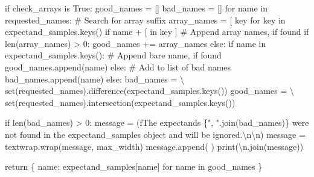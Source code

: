 \documentclass[
  letterpaper,
  DIV=11,
  numbers=noendperiod]{scrartcl}
\newenvironment{Shaded}{\begin{snugshade}}{\end{snugshade}}
\newcommand{\BuiltInTok}[1]{\textcolor[rgb]{0.00,0.23,0.31}{#1}}
\newcommand{\CharTok}[1]{\textcolor[rgb]{0.13,0.47,0.30}{#1}}
\newcommand{\CommentTok}[1]{\textcolor[rgb]{0.37,0.37,0.37}{#1}}
\newcommand{\ControlFlowTok}[1]{\textcolor[rgb]{0.00,0.23,0.31}{#1}}
\newcommand{\DecValTok}[1]{\textcolor[rgb]{0.68,0.00,0.00}{#1}}
\newcommand{\KeywordTok}[1]{\textcolor[rgb]{0.00,0.23,0.31}{#1}}
\newcommand{\NormalTok}[1]{\textcolor[rgb]{0.00,0.23,0.31}{#1}}
\newcommand{\OperatorTok}[1]{\textcolor[rgb]{0.37,0.37,0.37}{#1}}
\newcommand{\SpecialCharTok}[1]{\textcolor[rgb]{0.37,0.37,0.37}{#1}}
\newcommand{\SpecialStringTok}[1]{\textcolor[rgb]{0.13,0.47,0.30}{#1}}
\newcommand{\StringTok}[1]{\textcolor[rgb]{0.13,0.47,0.30}{#1}}
\newcommand{\VariableTok}[1]{\textcolor[rgb]{0.07,0.07,0.07}{#1}}
\begin{document}
\begin{Shaded}
\begin{Highlighting}[]
  \ControlFlowTok{if}\NormalTok{ check\_arrays }\KeywordTok{is} \VariableTok{True}\NormalTok{:}
\NormalTok{    good\_names }\OperatorTok{=}\NormalTok{ []}
\NormalTok{    bad\_names }\OperatorTok{=}\NormalTok{ []}
    \ControlFlowTok{for}\NormalTok{ name }\KeywordTok{in}\NormalTok{ requested\_names:}
      \CommentTok{\# Search for array suffix}
\NormalTok{      array\_names }\OperatorTok{=}\NormalTok{ [ key }\ControlFlowTok{for}\NormalTok{ key }\KeywordTok{in}\NormalTok{ expectand\_samples.keys()}
                      \ControlFlowTok{if}\NormalTok{ name }\OperatorTok{+} \StringTok{\textquotesingle{}[\textquotesingle{}} \KeywordTok{in}\NormalTok{ key ]}
      \CommentTok{\# Append array names, if found}
      \ControlFlowTok{if} \BuiltInTok{len}\NormalTok{(array\_names) }\OperatorTok{\textgreater{}} \DecValTok{0}\NormalTok{:}
\NormalTok{        good\_names }\OperatorTok{+=}\NormalTok{ array\_names}
      \ControlFlowTok{else}\NormalTok{:}
        \ControlFlowTok{if}\NormalTok{ name }\KeywordTok{in}\NormalTok{ expectand\_samples.keys():}
          \CommentTok{\# Append bare name, if found}
\NormalTok{          good\_names.append(name)}
        \ControlFlowTok{else}\NormalTok{:}
          \CommentTok{\# Add to list of bad names}
\NormalTok{          bad\_names.append(name)}
  \ControlFlowTok{else}\NormalTok{:}
\NormalTok{    bad\_names }\OperatorTok{=} \OperatorTok{\textbackslash{}}
      \BuiltInTok{set}\NormalTok{(requested\_names).difference(expectand\_samples.keys())}
\NormalTok{    good\_names }\OperatorTok{=} \OperatorTok{\textbackslash{}}
      \BuiltInTok{set}\NormalTok{(requested\_names).intersection(expectand\_samples.keys())}
    
  \ControlFlowTok{if} \BuiltInTok{len}\NormalTok{(bad\_names) }\OperatorTok{\textgreater{}} \DecValTok{0}\NormalTok{:}
\NormalTok{    message }\OperatorTok{=}\NormalTok{ (}\SpecialStringTok{f\textquotesingle{}The expectands }\SpecialCharTok{\{}\StringTok{", "}\SpecialCharTok{.}\NormalTok{join(bad\_names)}\SpecialCharTok{\}}\SpecialStringTok{ \textquotesingle{}}
               \StringTok{\textquotesingle{}were not found in the \textasciigrave{}expectand\_samples\textasciigrave{} \textquotesingle{}}
               \StringTok{\textquotesingle{}object and will be ignored.}\CharTok{\textbackslash{}n\textbackslash{}n}\StringTok{\textquotesingle{}}\NormalTok{)}
\NormalTok{    message }\OperatorTok{=}\NormalTok{ textwrap.wrap(message, max\_width)}
\NormalTok{    message.append(}\StringTok{\textquotesingle{} \textquotesingle{}}\NormalTok{)}
    \BuiltInTok{print}\NormalTok{(}\StringTok{\textquotesingle{}}\CharTok{\textbackslash{}n}\StringTok{\textquotesingle{}}\NormalTok{.join(message))}
  
  \ControlFlowTok{return}\NormalTok{ \{ name: expectand\_samples[name] }\ControlFlowTok{for}\NormalTok{ name }\KeywordTok{in}\NormalTok{ good\_names \}}
\end{Highlighting}
\end{Shaded}
\end{document}
